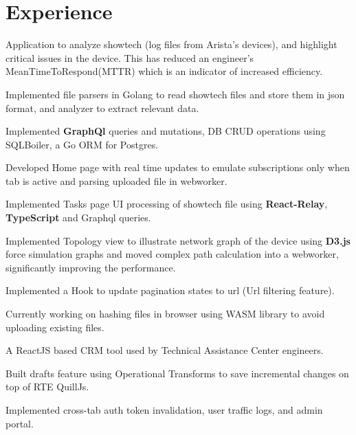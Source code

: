 \documentclass[]{deedy-resume-openfont}
\begin{document}
\begin{minipage}[t]{0.74\textwidth} 


\section{Experience}
\smallskip

Application to analyze showtech (log files from Arista's devices), and highlight critical issues in the device. This has reduced an engineer’s MeanTimeToRespond(MTTR) which is an indicator of increased efficiency.
\vspace{\topsep} %
\begin{tightemize}
\item Implemented file parsers in Golang to read showtech files and store them in json format, and analyzer to extract relevant data.
\item Implemented \textbf{GraphQl} queries and mutations, DB CRUD operations using SQLBoiler, a Go ORM for Postgres.
\item Developed Home page with real time updates to emulate subscriptions only when tab is active and parsing uploaded file in webworker.
\item Implemented Tasks page UI processing of showtech file using \textbf{React-Relay}, \textbf{TypeScript} and Graphql queries.
\item Implemented Topology view to illustrate network graph of the device using \textbf{D3.js} force simulation graphs and moved complex path calculation into a webworker, significantly improving the performance.
\item Implemented a Hook to update pagination states to url (Url filtering feature).
\item Currently working on hashing files in browser using WASM library to avoid uploading existing files.
\end{tightemize}
\smallskip

A ReactJS based CRM tool used by Technical Assistance Center engineers.
\begin{tightemize}
    \item Built drafts feature using Operational Transforms to save incremental changes on top of RTE QuillJs.
    \item Implemented cross-tab auth token invalidation, user traffic logs, and admin portal.
\end{tightemize}
\smallskip


\end{minipage}
\end{document}
